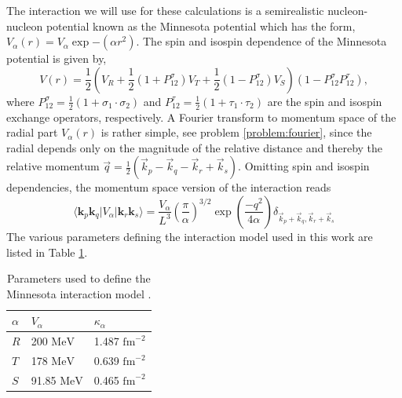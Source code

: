 The interaction we will use for these calculations is a semirealistic nucleon-nucleon potential known as the Minnesota potential \cite{minnesota} which has the form, $V_{\alpha}\left( r\right)=V_{\alpha}\exp{-(\alpha r^{2})}$. The spin and isospin dependence of the Minnesota potential is given by,
\begin{equation}
V\left( r\right)=\frac{1}{2}\left( V_{R}+\frac{1}{2}\left( 1+P_{12}^{\sigma}\right) V_{T}+\frac{1}{2}\left( 1-P_{12}^{\sigma}\right) V_{S}\right)\left( 1-P_{12}^{\sigma}P_{12}^{\tau}\right),
\end{equation}
where $P_{12}^{\sigma}=\frac{1}{2}\left( 1+\sigma_{1}\cdot\sigma_{2}\right)$ and $P_{12}^{\tau}=\frac{1}{2}\left( 1+\tau_{1}\cdot\tau_{2}\right)$ are the spin and isospin exchange operators, respectively. A Fourier transform to momentum space of the radial part $V_{\alpha}\left( r\right)$ is rather simple, see problem \ref{problem:fourier}, since  the radial depends only on the magnitude of the relative distance and thereby the relative momentum $\vec{q}=\frac{1}{2}\left(\vec{k}_{p}-\vec{k}_{q}-\vec{k}_{r}+\vec{k}_{s}\right)$. Omitting spin and isospin dependencies, the momentum space version of the interaction reads
\begin{equation}
\langle \mathbf{k}_p \mathbf{k}_q \vert V_{\alpha}\vert \mathbf{k}_r\mathbf{k}_s\rangle=\frac{V_{\alpha}}{L^{3}}\left(\frac{\pi}{\alpha}\right)^{3/2}\exp{(\frac{-q^{2}}{4\alpha})}\delta_{\vec{k}_{p}+\vec{k}_{q},\vec{k}_{r}+\vec{k}_{s}}
\end{equation}
The various parameters defining the interaction model used in this work are listed in Table \ref{tab:minnesotatab}. 
\begin{table}
\caption{Parameters used to define the Minnesota interaction model \cite{minnesota}.}\label{tab:minnesotatab}
\begin{center}
  \begin{tabular}{| l | l | l |}
    \hline
    $\alpha$ & $V_{\alpha}$ & $\kappa_{\alpha}$ \\ \hline
    $R$ & 200 $\mathrm{MeV}$ & 1.487 $\mathrm{fm}^{-2}$ \\ \hline
    $T$ & 178 $\mathrm{MeV}$ & 0.639 $\mathrm{fm}^{-2}$ \\ \hline
    $S$ & 91.85 $\mathrm{MeV}$ & 0.465 $\mathrm{fm}^{-2}$ \\ \hline
  \end{tabular}
\end{center}
\end{table}


